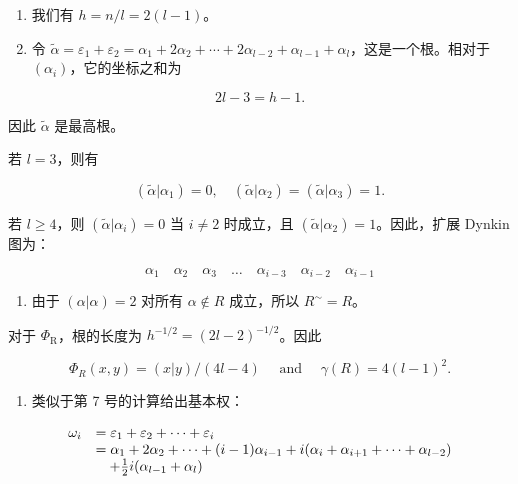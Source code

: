 \begin{enumerate}
\def\labelenumi{(\Roman{enumi})}
\setcounter{enumi}{2}
\item
  我们有 \(h = n / l = 2(l - 1)\)。
\item
  令 \(\tilde{\alpha} = \varepsilon_{1} + \varepsilon_{2} = \alpha_{1} + 2\alpha_{2} + \cdots + 2\alpha_{l-2} + \alpha_{l-1} + \alpha_{l}\)，这是一个根。相对于 \((\alpha_{i})\)，它的坐标之和为
\end{enumerate}

\[
2 l - 3 = h - 1.
\]

因此 \(\tilde{\alpha}\) 是最高根。

若 \(l = 3\)，则有

\[
(\tilde {\alpha} | \alpha_ {1}) = 0, \quad (\tilde {\alpha} | \alpha_ {2}) = (\tilde {\alpha} | \alpha_ {3}) = 1.
\]

若 \(l \geqslant 4\)，则 \((\tilde{\alpha}|\alpha_i) = 0\) 当 \(i \neq 2\) 时成立，且 \((\tilde{\alpha}|\alpha_2) = 1\)。因此，扩展 Dynkin 图为：

\[
\alpha_ {1} \quad \alpha_ {2} \quad \alpha_ {3} \quad \dots \quad \alpha_ {i - 3} \quad \alpha_ {i - 2} \quad \alpha_ {i - 1}
\]

\begin{enumerate}
\def\labelenumi{(\Alph{enumi})}
\setcounter{enumi}{21}
\tightlist
\item
  由于 \((\alpha |\alpha) = 2\) 对所有 \(\alpha \notin R\) 成立，所以 \(R^{\sim} = R\)。
\end{enumerate}

对于 \(\Phi_{\mathrm{R}}\)，根的长度为 \(h^{-1 / 2} = (2l - 2)^{-1 / 2}\)。因此

\[
\Phi_ {R} (x, y) = (x | y) / (4 l - 4) \quad \text { and } \quad \gamma (R) = 4 (l - 1) ^ {2}.
\]

\begin{enumerate}
\def\labelenumi{(\Roman{enumi})}
\setcounter{enumi}{5}
\tightlist
\item
  类似于第 7 号的计算给出基本权：
\end{enumerate}

\[
\begin{array}{r l} \omega_ {i} & = \varepsilon_ {1} + \varepsilon_ {2} + \dots + \varepsilon_ {i} \\ & = \alpha_ {1} + 2 \alpha_ {2} + \dots + (i - 1) \alpha_ {i - 1} + i (\alpha_ {i} + \alpha_ {i + 1} + \dots + \alpha_ {l - 2}) \\ & \quad + \frac {1}{2} i (\alpha_ {l - 1} + \alpha_ {l}) \end{array}
\]

